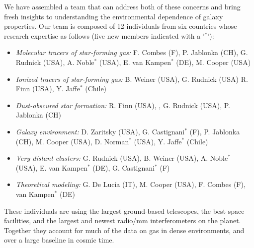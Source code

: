 \documentclass[11pt]{article}
\begin{document}

We have assembled a team that can address both of these concerns and bring fresh insights to understanding the environmental dependence of galaxy properties. Our team is composed of 12 individuals from six countries whose research expertise as follows (five new members indicated with a '$^*$'):
\vspace{-0.1in}
\begin{itemize} 
\item \textit{Molecular tracers of star-forming gas:} F. Combes (F), P. Jablonka (CH), G. Rudnick (USA),
A. Noble$^*$ (USA), E. van Kampen$^*$ (DE), M. Cooper (USA)
\vspace{-0.1in}
\item \textit{Ionized tracers of star-forming gas:} B. Weiner (USA), G. Rudnick (USA) R. Finn (USA), Y. Jaffe$^*$ (Chile) 
\vspace{-0.1in}
\item \textit{Dust-obscured star formation:} R. Finn (USA), , G. Rudnick (USA), P. Jablonka (CH)
\vspace{-0.1in}
\item \textit{Galaxy environment:} D. Zaritsky (USA), G. Castignani$^*$ (F), P. Jablonka (CH), M. Cooper (USA), D. Norman$^*$ (USA), Y. Jaffe$^*$ (Chile)
\vspace{-0.1in}
\item \textit{Very distant clusters:} G. Rudnick (USA), B. Weiner (USA), A. Noble$^*$ (USA), E. van Kampen$^*$ (DE), G. Castignani$^*$ (F) 
\vspace{-0.1in}
\item \textit{Theoretical modeling:} G. De Lucia (IT), M. Cooper (USA), F. Combes (F), van Kampen$^*$ (DE)
\end{itemize}
These individuals are using the largest ground-based telescopes, the best space facilities, and the largest and newest radio/mm interferometers on the planet.  Together they account for much of the data on gas in dense environments, and over a large baseline in cosmic time.  
\end{document}
